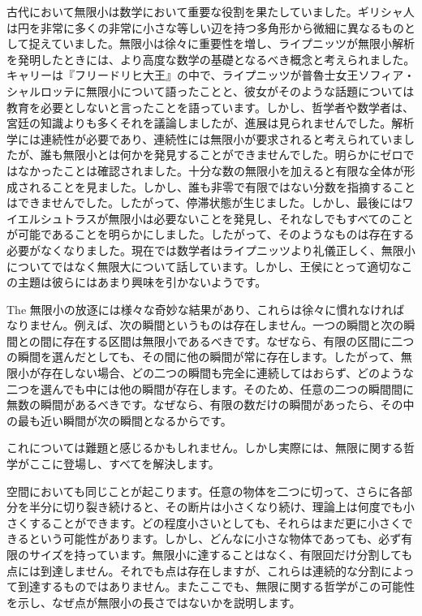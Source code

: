 \documentclass[a4paper,11pt,openany]{ltjsbook}
\begin{document}
古代において無限小は数学において重要な役割を果たしていました。ギリシャ人は円を非常に多くの非常に小さな等しい辺を持つ多角形から微細に異なるものとして捉えていました。無限小は徐々に重要性を増し、ライプニッツが無限小解析を発明したときには、より高度な数学の基礎となるべき概念と考えられました。キャリーは『フリードリヒ大王』の中で、ライプニッツが普魯士女王ソフィア・シャルロッテに無限小について語ったことと、彼女がそのような話題については教育を必要としないと言ったことを語っています。しかし、哲学者や数学者は、宮廷の知識よりも多くそれを議論しましたが、進展は見られませんでした。解析学には連続性が必要であり、連続性には無限小が要求されると考えられていましたが、誰も無限小とは何かを発見することができませんでした。明らかにゼロではなかったことは確認されました。十分な数の無限小を加えると有限な全体が形成されることを見ました。しかし、誰も非零で有限ではない分数を指摘することはできませんでした。したがって、停滞状態が生じました。しかし、最後にはワイエルシュトラスが無限小は必要ないことを発見し、それなしでもすべてのことが可能であることを明らかにしました。したがって、そのようなものは存在する必要がなくなりました。現在では数学者はライプニッツより礼儀正しく、無限小についてではなく無限大について話しています。しかし、王侯にとって適切なこの主題は彼らにはあまり興味を引かないようです。

The 無限小の放逐には様々な奇妙な結果があり、これらは徐々に慣れなければなりません。例えば、次の瞬間というものは存在しません。一つの瞬間と次の瞬間との間に存在する区間は無限小であるべきです。なぜなら、有限の区間に二つの瞬間を選んだとしても、その間に他の瞬間が常に存在します。したがって、無限小が存在しない場合、どの二つの瞬間も完全に連続してはおらず、どのような二つを選んでも中には他の瞬間が存在します。そのため、任意の二つの瞬間間に無数の瞬間があるべきです。なぜなら、有限の数だけの瞬間があったら、その中の最も近い瞬間が次の瞬間となるからです。

これについては難題と感じるかもしれません。しかし実際には、無限に関する哲学がここに登場し、すべてを解決します。

空間においても同じことが起こります。任意の物体を二つに切って、さらに各部分を半分に切り裂き続けると、その断片は小さくなり続け、理論上は何度でも小さくすることができます。どの程度小さいとしても、それらはまだ更に小さくできるという可能性があります。しかし、どんなに小さな物体であっても、必ず有限のサイズを持っています。無限小に達することはなく、有限回だけ分割しても点には到達しません。それでも点は存在しますが、これらは連続的な分割によって到達するものではありません。またここでも、無限に関する哲学がこの可能性を示し、なぜ点が無限小の長さではないかを説明します。
\end{document}
